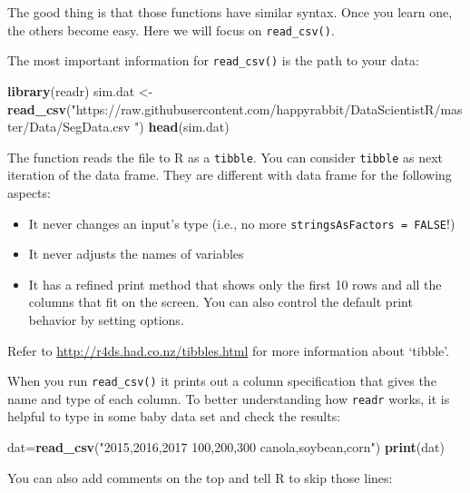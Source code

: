 \documentclass[12pt,]{krantz}
\makeatletter
\newenvironment{Shaded}{\begin{snugshade}}{\end{snugshade}}
\newcommand{\KeywordTok}[1]{\textcolor[rgb]{0.27,0.27,0.27}{\textbf{#1}}}
\newcommand{\StringTok}[1]{\textcolor[rgb]{0.5,0.5,0.5}{#1}}
\newcommand{\NormalTok}[1]{#1}
\providecommand{\tightlist}{%
  \setlength{\itemsep}{0pt}\setlength{\parskip}{0pt}}
\newenvironment{kframe}{%
\medskip{}
\setlength{\fboxsep}{.8em}
 \def\at@end@of@kframe{}%
 \ifinner\ifhmode%
  \def\at@end@of@kframe{\end{minipage}}%
  \begin{minipage}{\columnwidth}%
 \fi\fi%
 \def\FrameCommand##1{\hskip\@totalleftmargin \hskip-\fboxsep
 \colorbox{shadecolor}{##1}\hskip-\fboxsep
     \hskip-\linewidth \hskip-\@totalleftmargin \hskip\columnwidth}%
 \MakeFramed {\advance\hsize-\width
   \@totalleftmargin\z@ \linewidth\hsize
   \@setminipage}}%
 {\par\unskip\endMakeFramed%
 \at@end@of@kframe}
\renewenvironment{Shaded}{\begin{kframe}}{\end{kframe}}
\theoremstyle{definition}
\theoremstyle{definition}
\theoremstyle{definition}
\theoremstyle{remark}
\makeatother
\begin{document}
The good thing is that those functions have similar syntax. Once you
learn one, the others become easy. Here we will focus on
\texttt{read\_csv()}.

The most important information for \texttt{read\_csv()} is the path to
your data:

\begin{Shaded}
\begin{Highlighting}[]
\KeywordTok{library}\NormalTok{(readr)}
\NormalTok{sim.dat <-}\StringTok{ }\KeywordTok{read_csv}\NormalTok{(}\StringTok{"https://raw.githubusercontent.com/happyrabbit/DataScientistR/master/Data/SegData.csv "}\NormalTok{)}
\KeywordTok{head}\NormalTok{(sim.dat)}
\end{Highlighting}
\end{Shaded}

The function reads the file to R as a \texttt{tibble}. You can consider
\texttt{tibble} as next iteration of the data frame. They are different
with data frame for the following aspects:

\begin{itemize}
\tightlist
\item
  It never changes an input's type (i.e., no more
  \texttt{stringsAsFactors\ =\ FALSE}!)
\item
  It never adjusts the names of variables
\item
  It has a refined print method that shows only the first 10 rows and
  all the columns that fit on the screen. You can also control the
  default print behavior by setting options.
\end{itemize}

Refer to \url{http://r4ds.had.co.nz/tibbles.html} for more information
about `tibble'.

When you run \texttt{read\_csv()} it prints out a column specification
that gives the name and type of each column. To better understanding how
\texttt{readr} works, it is helpful to type in some baby data set and
check the results:

\begin{Shaded}
\begin{Highlighting}[]
\NormalTok{dat=}\KeywordTok{read_csv}\NormalTok{(}\StringTok{"2015,2016,2017}
\StringTok{100,200,300}
\StringTok{canola,soybean,corn"}\NormalTok{)}
\KeywordTok{print}\NormalTok{(dat)}
\end{Highlighting}
\end{Shaded}

You can also add comments on the top and tell R to skip those lines:
\end{document}
